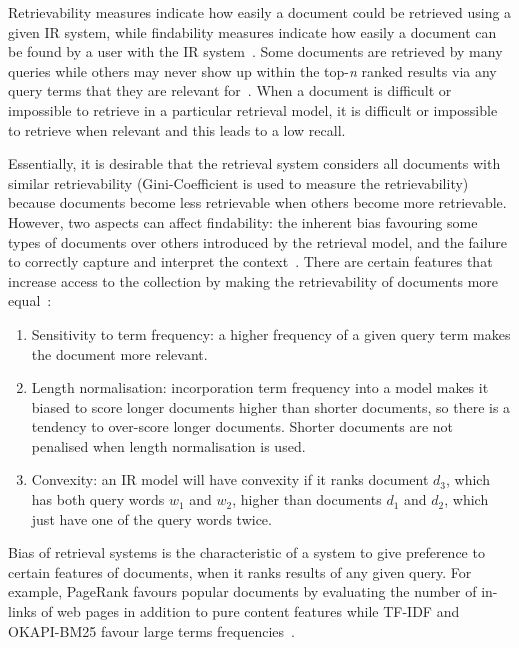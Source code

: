 Retrievability measures indicate how easily a document could be retrieved using a given IR system, while findability measures indicate how easily a document can be found by a user with the IR system~\citep{azzopardi2008retrievability}. Some documents are retrieved by many queries while others may never show up within the top-\textit{n} ranked results via any query terms that they are relevant for~\citep{lupu2013patent}. When a document is difficult or impossible to retrieve in a particular retrieval model, it is difficult or impossible to retrieve when relevant and this leads to a low recall. 

Essentially, it is desirable that the retrieval system considers all documents with similar retrievability (Gini-Coefficient is used to measure the retrievability) because documents become less retrievable when others become more retrievable. However, two aspects can affect findability: the inherent bias favouring some types of documents over others introduced by the retrieval model, and the failure to correctly capture and interpret the context~\citep{bashir2009improving, bashir2011relationship}. There are certain features that increase access to the collection by making the retrievability of documents more equal~\citep{bache2010improving}:
\begin{enumerate}
\item Sensitivity to term frequency: a higher frequency of a given query term makes the document more relevant.
\item Length normalisation: incorporation term frequency into a model makes it biased to score longer documents higher than shorter documents, so there is a tendency to over-score longer documents. Shorter documents are not penalised when length normalisation is used.
\item Convexity: an IR model will have convexity if it ranks document $ d_{3} $, which has both query words $ w_{1} $ and $ w_{2} $, higher than documents $ d_{1} $ and $ d_{2} $, which just have one of the query words twice. 
\end{enumerate}
Bias of retrieval systems is the characteristic of a system to give preference to certain features of documents, when it ranks results of any given query. For example, PageRank favours popular documents by evaluating the number of in-links of web pages in addition to pure content features while TF-IDF and OKAPI-BM25 favour large terms frequencies~\citep{bashir2011relationship}.
